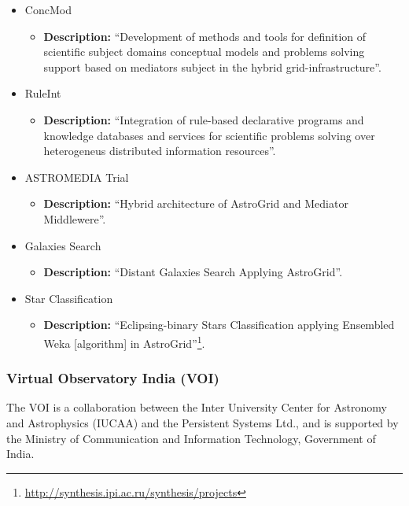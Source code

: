 \begin{itemize}
\begin{itemize}
\item ConcMod
\begin{itemize}
\item \textbf{Description:} ``Development of methods and tools for definition of
scientific subject domains conceptual models and problems solving support based
on mediators subject in the hybrid grid-infrastructure''.
\end{itemize}
\item RuleInt
\begin{itemize}
\item \textbf{Description:} ``Integration of rule-based declarative programs and
knowledge databases and services for scientific problems solving over
heterogeneus distributed information resources''.
\end{itemize}
\item ASTROMEDIA Trial
\begin{itemize}
\item \textbf{Description:} ``Hybrid architecture of AstroGrid and Mediator
Middlewere''.
\end{itemize}
\item Galaxies Search
\begin{itemize}
\item \textbf{Description:} ``Distant Galaxies Search Applying AstroGrid''.
\end{itemize}
\item Star Classification
\begin{itemize}
\item \textbf{Description:} ``Eclipsing-binary Stars Classification applying
Ensembled Weka [algorithm] in
AstroGrid''\footnote{\url{http://synthesis.ipi.ac.ru/synthesis/projects}}.
\end{itemize}
\end{itemize}
\end{itemize}

\subsubsection{Virtual Observatory India (VOI)}
The VOI is a collaboration between the Inter University Center for Astronomy and
Astrophysics (IUCAA) and the Persistent Systems Ltd., and is supported by the
Ministry of Communication and Information Technology, Government of India.

